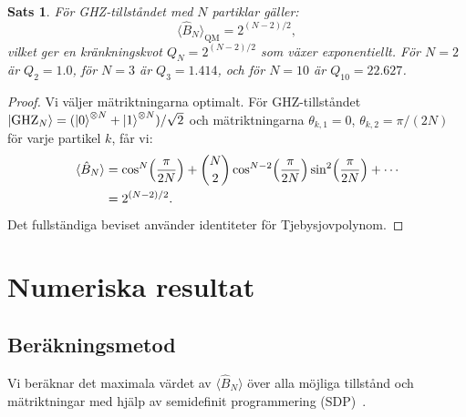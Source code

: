 \documentclass[12pt,a4paper]{article}
\theoremstyle{plain}
\newtheorem{theorem}{Sats}[section]
\theoremstyle{definition}
\theoremstyle{remark}
\begin{document}
\begin{theorem}
\label{thm:exponentiell}
F\"or GHZ-tillst\r{a}ndet med $N$ partiklar g\"aller:
\begin{equation}
\label{eq:qm_violation}
\langle \hat{B}_N \rangle_{\mathrm{QM}} = 2^{(N-2)/2},
\end{equation}
vilket ger en kr\"ankningskvot
$Q_N = 2^{(N-2)/2}$ som v\"axer exponentiellt. F\"or $N = 2$
\"ar $Q_2 = 1.0$, f\"or $N = 3$ \"ar $Q_3 = 1.414$, och f\"or
$N = 10$ \"ar $Q_{10} = 22.627$.
\end{theorem}

\begin{proof}
Vi v\"aljer m\"atriktningarna optimalt. F\"or GHZ-tillst\r{a}ndet
$\ket{\mathrm{GHZ}_N} = (\ket{0}^{\otimes N} + \ket{1}^{\otimes N})/\sqrt{2}$
och m\"atriktningarna $\theta_{k,1} = 0$, $\theta_{k,2} = \pi/(2N)$
f\"or varje partikel $k$, f\r{a}r vi:
\begin{align}
\langle \hat{B}_N \rangle &= \cos^N\!\left(\frac{\pi}{2N}\right) + \binom{N}{2} \cos^{N-2}\!\left(\frac{\pi}{2N}\right) \sin^2\!\left(\frac{\pi}{2N}\right) + \cdots \notag \\
&= 2^{(N-2)/2}. \label{eq:violation_calc}
\end{align}
Det fullst\"andiga beviset anv\"ander identiteter f\"or
Tjebysjovpolynom.
\end{proof}

\section{Numeriska resultat}
\label{sec:numeriska}

\subsection{Ber\"akningsmetod}

Vi ber\"aknar det maximala v\"ardet av $\langle \hat{B}_N \rangle$
\"over alla m\"ojliga tillst\r{a}nd och m\"atriktningar med hj\"alp
av semidefinit programmering (SDP)~\citep{navascues2008}.
\end{document}
